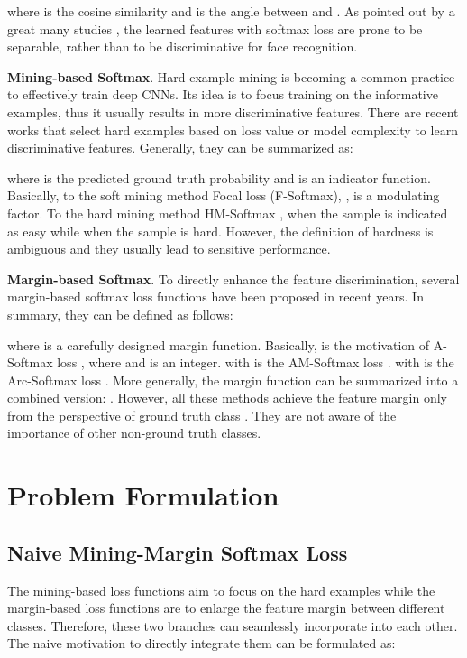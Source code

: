 \documentclass[10pt,twocolumn,letterpaper]{article}
\begin{document}
where  is the cosine similarity and  is the angle between  and . As pointed out by a great many studies \cite{L-softmax,SphereFace,AM-Softmax,Arc-Softmax}, the learned features with softmax loss are prone to be separable, rather than to be discriminative for face recognition.

\noindent \textbf{Mining-based Softmax}. Hard example mining is becoming a common practice to effectively train deep CNNs. Its idea is to focus training on the informative examples, thus it usually results in more discriminative features. There are recent works that select hard examples based on loss value \cite{OHEM,Focal} or model complexity \cite{Yuan} to learn discriminative features. Generally, they can be summarized as:

where  is the predicted ground truth probability and  is an indicator function. Basically, to the soft mining method Focal loss \cite{Focal} (F-Softmax), ,  is a modulating factor. To the hard mining method HM-Softmax \cite{OHEM},  when the sample is indicated as easy while  when the sample is hard. However, the definition of hardness is ambiguous and they usually lead to sensitive performance.

\noindent \textbf{Margin-based Softmax}. To directly enhance the feature discrimination, several margin-based softmax loss functions \cite{SphereFace,EM-Softmax,AM-Softmax,Arc-Softmax} have been proposed in recent years. In summary, they can be defined as follows:

where  is a carefully designed margin function. Basically,
 is the motivation of A-Softmax loss \cite{SphereFace}, where  and is an integer.  with  is the AM-Softmax loss \cite{AM-Softmax}.  with  is the Arc-Softmax loss \cite{Arc-Softmax}. More generally, the margin function can be summarized into a combined version: . However, all these methods achieve the feature margin only from the perspective of ground truth class . They are not aware of the importance of other non-ground truth classes.

\section{Problem Formulation} \label{main}
\subsection{Naive Mining-Margin Softmax Loss}
The mining-based loss functions aim to focus on the hard examples while the margin-based loss functions are to enlarge the feature margin between different classes. Therefore, these two branches can seamlessly incorporate into each other. The naive motivation to directly integrate them can be formulated as:
\end{document}
